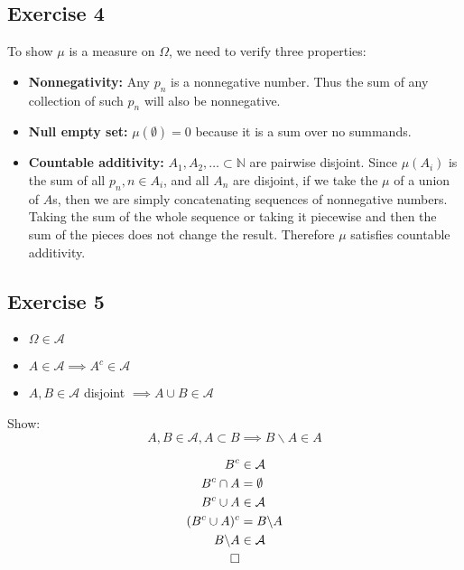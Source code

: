 \documentclass{article}
\begin{document}
\subsection*{Exercise 4}

To show $\mu$ is a measure on $\Omega$, we need to verify three properties:
\begin{itemize}
    \item \textbf{Nonnegativity:} Any $p_n$ is a nonnegative number. Thus the sum of any collection of such $p_n$ will also be nonnegative.
    \item \textbf{Null empty set:} $\mu(\emptyset) = 0$ because it is a sum over no summands.
    \item \textbf{Countable additivity:} $A_1, A_2, \dots \subset \mathbb{N}$ are pairwise disjoint. Since $\mu(A_i)$ is the sum of all $p_n, n \in A_i$, and all $A_n$ are disjoint, if we take the $\mu$ of a union of $A$s, then we are simply concatenating sequences of nonnegative numbers. Taking the sum of the whole sequence or taking it piecewise and then the sum of the pieces does not change the result. Therefore $\mu$ satisfies countable additivity.
\end{itemize}

\subsection*{Exercise 5}
\begin{itemize}
    \item $\Omega \in \mathcal{A}$
    \item $A \in \mathcal{A} \implies A^c \in \mathcal{A}$
    \item $A, B \in \mathcal{A}$ disjoint $\implies A \cup B \in \mathcal{A}$
\end{itemize}
Show:
\[
    A, B \in \mathcal{A}, A \subset B \implies B \backslash A \in A
\]

\begin{align*}
    B^c &\in \mathcal{A} \\
    B^c \cap A &= \emptyset \\
    B^c \cup A &\in \mathcal{A} \\
    (B^c \cup A)^c &= B \backslash A \\
    B \backslash A &\in \mathcal{A} \\
    \qed
\end{align*}
\end{document}
